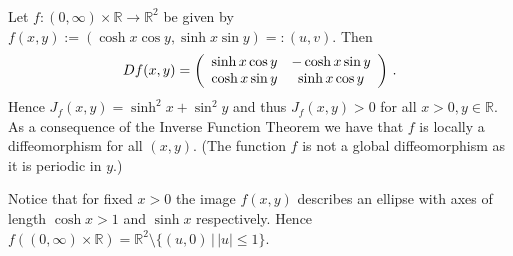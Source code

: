  \begin{frame}[fragile] \frametitle{}

Let $f \colon (0,\infty) \times \mathbb{R} \to \mathbb{R}^2$ be given by
$f(x,y) := (\cosh x \cos y, \sinh x \sin y)=:(u,v)$.
Then 
\[
Df(x,y) = \left ( \begin{array}{c c} \sinh x \cos y & - \cosh x \sin y \\ \cosh x \sin y & \sinh x \cos y
\end{array} \right ) \,.
\]
Hence $J_f(x,y) = \sinh^2 x + \sin^2 y$ and thus $J_f(x,y)>0$ for all $x>0, y \in \mathbb{R}$. 
As a consequence of the Inverse Function Theorem we have that $f$ is locally a diffeomorphism for all $(x,y)$.
(The function $f$  is not a global diffeomorphism as it is periodic in $y$.) 

Notice that for fixed $x>0$ the image $f(x,y)$ describes an ellipse with axes of length $\cosh x >1$ and
$\sinh x$ respectively.
Hence $f((0,\infty) \times \mathbb{R}) = \mathbb{R}^2 \setminus \{ (u,0) \, |\, |u| \leq 1 \}$.

\end{frame}
